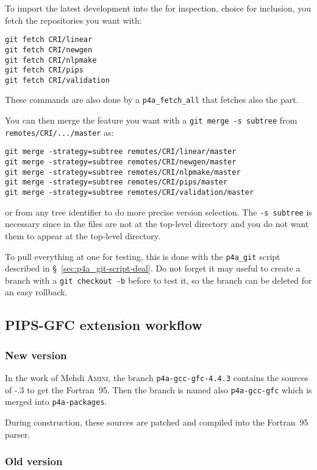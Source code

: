 \documentclass[a4paper]{article}
\begin{document}
To import the latest \Apips development into the \Apfa{} \Agit for
inspection, choice for inclusion, you fetch the repositories you want
with:
\begin{verbatim}
git fetch CRI/linear
git fetch CRI/newgen
git fetch CRI/nlpmake
git fetch CRI/pips
git fetch CRI/validation
\end{verbatim}
These commands are also done by a \verb|p4a_fetch_all| that fetches also the
\Apolylib part.

You can then merge the feature you want with a \texttt{git merge -s
  subtree} from \texttt{remotes/CRI/.../master} as:
\begin{verbatim}
git merge -strategy=subtree remotes/CRI/linear/master
git merge -strategy=subtree remotes/CRI/newgen/master
git merge -strategy=subtree remotes/CRI/nlpmake/master
git merge -strategy=subtree remotes/CRI/pips/master
git merge -strategy=subtree remotes/CRI/validation/master
\end{verbatim}
or from any tree identifier to do more precise version selection. The
\texttt{-s subtree} is necessary since in \Apfa the \Apips files are not
at the top-level directory and you do not want them to appear at the
top-level directory.

To pull everything at one for testing, this is done with the
\verb|p4a_git| script described in \S~\ref{sec:p4a_git-script-deal}. Do
not forget it may useful to create a branch with a \texttt{git checkout
  -b} before to test it, so the branch can be deleted for an easy
rollback.


\subsection{PIPS-GFC extension workflow}
\label{sec:pips-gfc-workflow}

\subsubsection{New version}
\label{sec:new-version}

In the work of Mehdi \textsc{Amini}, the branch
\texttt{p4a-gcc-gfc-4.4.3} contains the sources of \Agcc-.3 to
get the Fortran~95. Then the branch is named also \texttt{p4a-gcc-gfc}
which is merged into \texttt{p4a-packages}.

During \Apfa construction, these sources are patched and compiled into the
\Apips Fortran~95 parser.


\subsubsection{Old version}
\label{sec:old-version}
\end{document}
